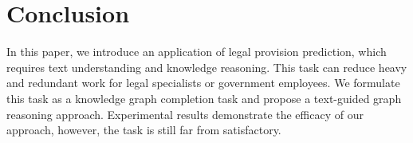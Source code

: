 \documentclass[runningheads]{llncs}
\begin{document}
\section{Conclusion}
In this paper, we introduce an application of legal provision prediction, which requires text understanding and knowledge reasoning. This task can reduce heavy and redundant work for legal specialists or government employees. We formulate this task as a knowledge graph completion task and propose a text-guided graph reasoning approach. Experimental results demonstrate the efficacy of our approach, however, the task is still far from satisfactory.  

%
%
%
 
 
%
 
\end{document}
